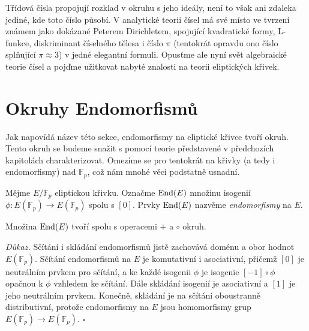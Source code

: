 \documentclass[12pt]{report}
\begin{document}
Třídová čísla propojují rozklad v okruhu s jeho ideály, není to však ani zdaleka jediné, kde toto číslo působí. V analytické teorii čísel má své místo ve tvrzení známem jako  dokázané Peterem Dirichletem, spojující kvadratické formy, L-funkce, diskriminant číselného tělesa i číslo $\pi$ (tentokrát opravdu ono číslo splňující $\pi \approx 3$) v jedné elegantní formuli. Opusťme ale nyní svět algebraické teorie čísel a pojďme užitkovat nabyté znalosti na teorii eliptických křivek.
 
 
\chapter{Okruhy Endomorfismů} 
 
Jak napovídá název této sekce, endomorfismy na eliptické křivce tvoří okruh. Tento okruh se budeme snažit s pomocí teorie představené v předchozích kapitolách charakterizovat. Omezíme se pro tentokrát na křivky (a tedy i endomorfismy) nad $\mathbb{F}_p$, což nám mnohé věci podstatně usnadní.
\begin{definice}
Mějme $E/\mathbb{F}_p$ eliptickou křivku. Označme $\operatorname{End}(E)$ množinu isogenií $\phi : E(\mathbb{F}_p) \longrightarrow E(\mathbb{F}_p)$ spolu s $[0]$. Prvky $\operatorname{End}(E)$ nazvěme \textit{endomorfismy} na $E$.
\end{definice}

\begin{veta}
Množina $\operatorname{End}(E)$ tvoří spolu s operacemi $+$ a $\circ$ okruh.
\end{veta}
\noindent \textit{Důkaz.} Sčítání i skládání endomorfismů jistě zachovává doménu a obor hodnot $E(\mathbb{F}_p)$. Sčítání endomorfismů na $E$ je komutativní i asociativní, přičemž $[0]$ je neutrálním prvkem pro sčítání, a ke každé isogenii $\phi$ je isogenie $[-1] \circ \phi$ opačnou k $\phi$ vzhledem ke sčítání. Dále skládání isogenií je asociativní a $[1]$ je jeho neutrálním prvkem. Konečně, skládání je na sčítání oboustranně distributivní, protože endomorfismy na $E$ jsou homomorfismy grup $E(\mathbb{F}_p) \longrightarrow E(\mathbb{F}_p)$. \hfill $\square$\\
\end{document}
